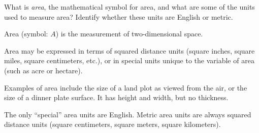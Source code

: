 

What is {\it area}, the mathematical symbol for area, and what are some of the units used to measure area?  Identify whether these units are English or metric.







Area (symbol: $A$) is the measurement of two-dimensional space.  

\vskip 10pt

Area may be expressed in terms of squared distance units (square inches, square miles, square centimeters, etc.), or in special units unique to the variable of area (such as acre or hectare).  







Examples of area include the size of a land plot as viewed from the air, or the size of a dinner plate surface.  It has height and width, but no thickness.

The only ``special'' area units are English.  Metric area units are always squared distance units (square centimeters, square meters, square kilometers).




